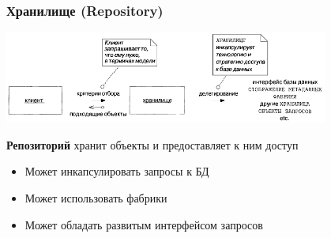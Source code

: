 \documentclass[xetex,mathserif,serif]{beamer}
\begin{document}
	\begin{frame}
		\frametitle{Хранилище (Repository)}
		\begin{center}
			\includegraphics[width=0.8\textwidth]{repository.png}
		\end{center}
		\textbf{Репозиторий} хранит объекты и предоставляет к ним доступ
		\begin{itemize}
			\item Может инкапсулировать запросы к БД
			\item Может использовать фабрики
			\item Может обладать развитым интерфейсом запросов
		\end{itemize}
	\end{frame}



\end{document}
